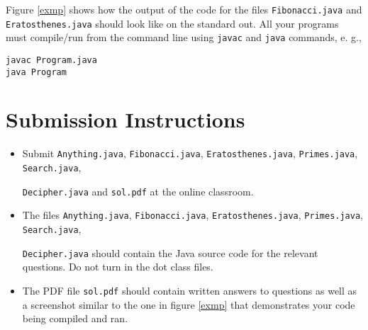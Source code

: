 \documentclass{homework}
\begin{document}
Figure \ref{exmp} shows how the output of the code for the files
\texttt{Fibonacci.java} and \texttt{Eratosthenes.java} should look
like on the standard out. All your programs must compile/run from
the command line using \texttt{javac} and \texttt{java} commands,
e. g.,

\begin{verbatim}
javac Program.java
java Program
\end{verbatim}


\section{Submission Instructions}

\begin{itemize}
  \item Submit \texttt{Anything.java}, \texttt{Fibonacci.java},
        \texttt{Eratosthenes.java}, \texttt{Primes.java},
        \texttt{Search.java},

        \noindent\texttt{Decipher.java} and
        \texttt{sol.pdf} at the online classroom.

  \item The files \texttt{Anything.java}, \texttt{Fibonacci.java},
        \texttt{Eratosthenes.java}, \texttt{Primes.java},
        \texttt{Search.java},

        \noindent\texttt{Decipher.java} should contain the
        Java source code for the relevant questions. Do not turn in the dot class files.

  \item The PDF file \texttt{sol.pdf} should contain written answers to
        questions as well as a screenshot similar to the one in figure \ref{exmp}
        that demonstrates your code being compiled and ran.
\end{itemize}


\end{document}
